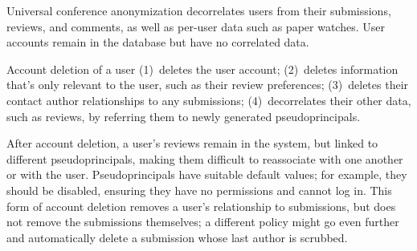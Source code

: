 Universal conference anonymization decorrelates users from their submissions, reviews, and comments,
as well as per-user data such as paper watches. User accounts remain in the database but have no
correlated data.

 Account deletion of a user
%
(1)~deletes the user account;
%
(2)~deletes information that's only relevant to the user, such as their review preferences;
%
(3)~deletes their contact author relationships to any submissions;
%
(4)~decorrelates their other data, such as reviews, by referring them to newly generated
pseudoprincipals.

After account deletion, a user's reviews remain in the system, but linked to different
pseudoprincipals, making them difficult to reassociate with one another or with the user.
%
Pseudoprincipals have suitable default values; for example, they should be disabled, ensuring they
have no permissions and cannot log in.
%
This form of account deletion removes a user's relationship to submissions, but does not remove the
submissions themselves; a different policy might go even further and automatically delete a
submission whose last author is scrubbed.

